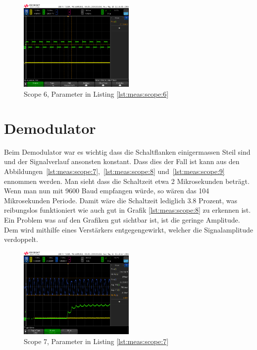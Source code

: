 \begin{figure}[h!tb]
    \centering
    \includegraphics[width=0.5\textwidth]{images/scopeShots/scope_6.png}
    \caption{Scope 6, Parameter in Listing \ref{lst:meas:scope:6}}
    \label{fig:meas:scope:6}
\end{figure}

\section{Demodulator}
\label{sec:val:demodulator}

Beim Demodulator war es wichtig dass die Schaltflanken einigermassen Steil sind und der Signalverlauf ansonsten konstant.
Dass dies der Fall ist kann aus den Abbildungen~\ref{lst:meas:scope:7},~\ref{lst:meas:scope:8} und~\ref{lst:meas:scope:9} ennommen werden.
Man sieht dass die Schaltzeit etwa 2 Mikrosekunden beträgt. Wenn man nun mit 9600 Baud empfangen würde, so wären das 104 Mikrosekunden Periode. Damit wäre die Schaltzeit lediglich 3.8 Prozent, was reibungslos funktioniert wie auch gut in Grafik \ref{lst:meas:scope:8} zu erkennen ist.
Ein Problem was auf den Grafiken gut sichtbar ist, ist die geringe Amplitude. Dem wird mithilfe eines Verstärkers entgegengewirkt, welcher die Signalamplitude verdoppelt.

\begin{figure}[h!tb]
    \centering
    \includegraphics[width=0.5\textwidth]{images/scopeShots/scope_7.png}
    \caption{Scope 7, Parameter in Listing \ref{lst:meas:scope:7}}
    \label{fig:meas:scope:7}
\end{figure}

